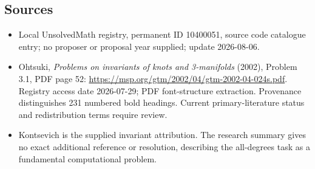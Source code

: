 \documentclass[11pt]{article}
\begin{document}
\subsection{Sources}
\begin{itemize}
\item Local UnsolvedMath registry, permanent ID 10400051, source code catalogue entry; no proposer or proposal year supplied; update 2026-08-06.
\item Ohtsuki, \emph{Problems on invariants of knots and 3-manifolds} (2002), Problem 3.1, PDF page 52: \url{https://msp.org/gtm/2002/04/gtm-2002-04-024s.pdf}. Registry access date 2026-07-29; PDF font-structure extraction. Provenance distinguishes 231 numbered bold headings. Current primary-literature status and redistribution terms require review.
\item Kontsevich is the supplied invariant attribution. The research summary gives no exact additional reference or resolution, describing the all-degrees task as a fundamental computational problem.
\end{itemize}
\end{document}
